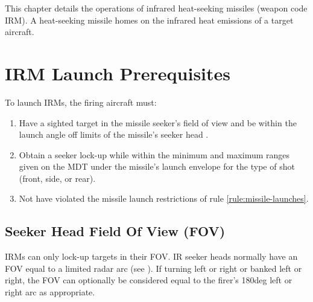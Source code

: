 
\label{rule:infrared-heat-seeking-missiles}

This chapter details the operations of infrared heat-seeking missiles (weapon code IRM). A heat-seeking missile homes on the infrared heat emissions of a target aircraft.

\section{IRM Launch Prerequisites}
\label{rule:irm-launch-prerequisites}
\label{rule:irm-launch-requirements}

To launch IRMs, the firing aircraft must:

\begin{enumerate}
    \item Have a sighted target in the missile seeker's field of view and be within the launch angle off limits of the missile's seeker head . 
    \item Obtain a seeker lock-up while within the minimum and maximum ranges given on the MDT under the missile's launch envelope for the type of shot (front, side, or rear).
    \item Not have violated the missile launch restrictions of rule \ref{rule:missile-launches}.
\end{enumerate}

\subsection{Seeker Head Field Of View (FOV)} IRMs can only lock-up targets in their FOV. IR seeker heads normally have an FOV equal to a limited radar arc (see ). If turning left or right or banked left or right, the FOV can optionally be considered equal to the firer’s 180{deg} left or right arc as appropriate. 


